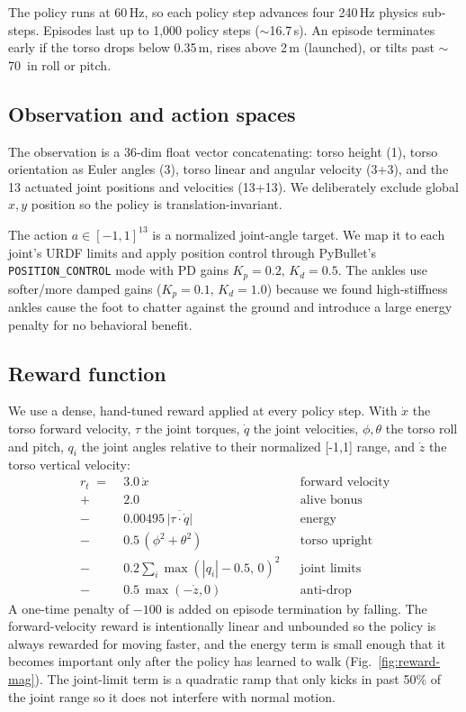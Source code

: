 \documentclass[sigconf,nonacm]{acmart}
\begin{document}
The policy runs at 60\,Hz, so each policy step advances four 240\,Hz physics
sub-steps. Episodes last up to 1{,}000 policy steps ($\sim$16.7\,s). An
episode terminates early if the torso drops below 0.35\,m, rises above 2\,m
(launched), or tilts past $\sim$70\textdegree~in roll or pitch.

\subsection{Observation and action spaces}
The observation is a 36-dim float vector concatenating: torso height (1),
torso orientation as Euler angles (3), torso linear and angular velocity (3+3),
and the 13 actuated joint positions and velocities (13+13). We deliberately
exclude global $x,y$ position so the policy is translation-invariant.

The action $a\in[-1,1]^{13}$ is a normalized joint-angle target. We map it to
each joint's URDF limits and apply position control through PyBullet's
\texttt{POSITION\_CONTROL} mode with PD gains $K_p{=}0.2,\,K_d{=}0.5$. The
ankles use softer/more damped gains ($K_p{=}0.1,\,K_d{=}1.0$) because we found
high-stiffness ankles cause the foot to chatter against the ground and
introduce a large energy penalty for no behavioral benefit.

\subsection{Reward function}
We use a dense, hand-tuned reward applied at every policy step. With
$\dot{x}$ the torso forward velocity, $\tau$ the joint torques, $\dot{q}$ the
joint velocities, $\phi,\theta$ the torso roll and pitch, $q_i$ the joint
angles relative to their normalized [-1,1] range, and $\dot{z}$ the torso
vertical velocity:
\begin{align}
r_t \;=\; & 3.0\,\dot{x} && \text{forward velocity} \nonumber \\
        + & 2.0 && \text{alive bonus} \nonumber \\
        - & 0.00495\,\overline{|\tau\cdot\dot{q}|} && \text{energy} \nonumber \\
        - & 0.5\,(\phi^2+\theta^2) && \text{torso upright} \nonumber \\
        - & 0.2\sum_i \max(|q_i|-0.5,\,0)^2 && \text{joint limits} \nonumber \\
        - & 0.5\,\max(-\dot{z},0) && \text{anti-drop} \nonumber
\end{align}
A one-time penalty of $-100$ is added on episode termination by falling. The
forward-velocity reward is intentionally linear and unbounded so the policy is
always rewarded for moving faster, and the energy term is small enough that it
becomes important only after the policy has learned to walk (Fig.\
\ref{fig:reward-mag}). The joint-limit term is a quadratic ramp that only kicks
in past 50\% of the joint range so it does not interfere with normal motion.
\end{document}
